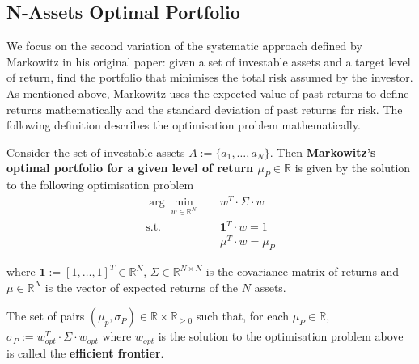 


\subsection{N-Assets Optimal Portfolio}\label{nassetssec}
    We focus on the second variation of the systematic approach defined by Markowitz in his original paper: given a set of investable assets and a target level of return, find the portfolio that minimises the total risk assumed by the investor. As mentioned above, Markowitz uses the expected value of past returns to define returns mathematically and the standard deviation of past returns for risk. The following definition describes the optimisation problem mathematically.
    
    \begin{definition}
        Consider the set of investable assets $A := \{ a_1, \dots, a_N \}$. Then \textbf{Markowitz's optimal portfolio for a given level of return $\mu_P \in \mathbb{R}$} is given by the solution to the following optimisation problem
        \begin{align*}
            \arg \min_{w \in \mathbb{R}^N}& \quad w^T \cdot \Sigma \cdot w \\
            \text{s.t.}& \quad \mathbf{1}^T \cdot w = 1 \\
            & \quad \mu^T \cdot w = \mu_P
        \end{align*}
        
        where $\mathbf{1} := [ 1, \dots, 1]^T \in \mathbb{R}^N$, $\Sigma \in \mathbb{R}^{N \times N}$ is the covariance matrix of returns and $\mu \in \mathbb{R}^N$ is the vector of expected returns of the $N$ assets.
        
        The set of pairs $(\mu_p, \sigma_P) \in \mathbb{R} \times \mathbb{R}_{\geq 0}$ such that, for each $\mu_P \in \mathbb{R}$, $\sigma_P := w_{opt}^T \cdot \Sigma \cdot w_{opt}$ where $w_{opt}$ is the solution to the optimisation problem above is called the \textbf{efficient frontier}.
    \end{definition}
	
